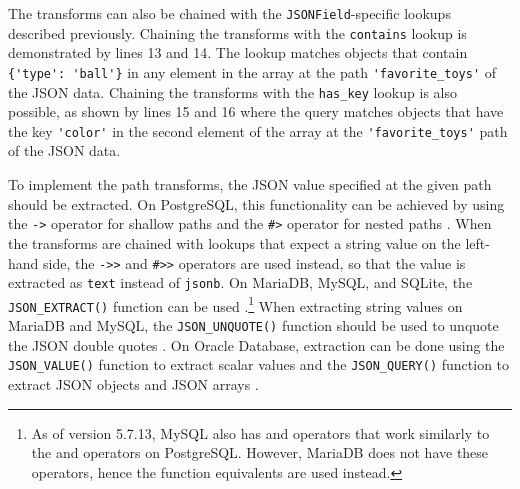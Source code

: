 The transforms can also be chained with the \verb|JSONField|-specific lookups
described previously. Chaining the transforms with the \verb|contains| lookup
is demonstrated by lines 13 and 14. The lookup matches objects that contain
\verb|{'type': 'ball'}| in any element in the array at the path
\verb|'favorite_toys'| of the JSON data. Chaining the transforms with the
\verb|has_key| lookup is also possible, as shown by lines 15 and 16 where the
query matches objects that have the key \verb|'color'| in the second element of
the array at the \verb|'favorite_toys'| path of the JSON data.

To implement the path transforms, the JSON value specified at the given path
should be extracted. On PostgreSQL, this functionality can be achieved by using
the \verb|->| operator for shallow paths and the \verb|#>| operator for nested
paths \cite{postgres:json_operators}. When the transforms are chained with
lookups that expect a string value on the left-hand side, the \verb|->>| and
\verb|#>>| operators are used instead, so that the value is extracted as
\verb|text| instead of \verb|jsonb|. On MariaDB, MySQL, and SQLite, the
\verb|JSON_EXTRACT()| function can be used \cite{mariadb:json_extract,
mysql:json_search, sqlite:json1}.\footnote{As of version 5.7.13, MySQL also has
\code{->} and \code{->>} operators that work similarly to the \code{\#>} and
\code{\#>>} operators on PostgreSQL. However, MariaDB does not have these
operators, hence the function equivalents are used instead.} When extracting
string values on MariaDB and MySQL, the \verb|JSON_UNQUOTE()| function should be
used to unquote the JSON double quotes \cite{mariadb:json_unquote,
mysql:json_modify}. On Oracle Database, extraction can be done using the
\verb|JSON_VALUE()| function to extract scalar values and the
\verb|JSON_QUERY()| function to extract JSON objects and JSON arrays
\cite{oracle:json_value, oracle:json_query}.

